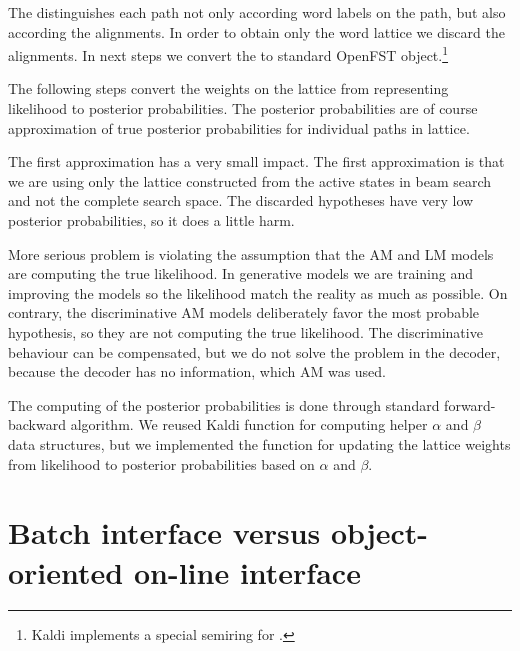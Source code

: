 The  distinguishes each path not only according word labels on the path,
but also according the alignments.
In order to obtain only the word lattice we discard the alignments.
In next steps we convert the  to standard OpenFST object.\footnote{Kaldi implements a special semiring for \cite{povey2012generating}.}  

The following steps convert the weights on the lattice from representing likelihood
to posterior probabilities. The posterior probabilities are of course approximation of
true posterior probabilities for individual paths in lattice. 

The first approximation has a very small impact. The first approximation is 
that we are using only the lattice constructed from the active states in beam search
and not the complete search space. 
The discarded hypotheses have very low posterior probabilities, so it does a little harm.

More serious problem is violating the assumption that the \ac{AM} and \ac{LM} models are 
computing the true likelihood. 
In generative models we are training and improving the models so the likelihood match
the reality as much as possible.
On contrary, the discriminative \ac{AM} models deliberately favor the most probable hypothesis,
so they are not computing the true likelihood.
The discriminative behaviour can be compensated, but we do not solve the problem
in the decoder, because the decoder has no information, which \ac{AM} was used.


The computing of the posterior probabilities is done through
standard forward-backward algorithm\cite{todo}.
We reused Kaldi function for computing helper $\alpha$ and $\beta$ data structures,
but we implemented the  function for updating the lattice weights 
from likelihood to posterior probabilities based on $\alpha$ and $\beta$.

\section{Batch interface versus object-oriented on-line interface}
\label{sec:ooi}


